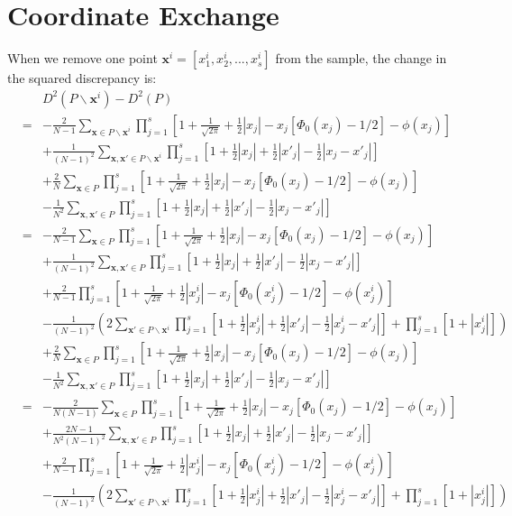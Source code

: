 \documentclass[12pt]{article}
\newcommand{\vx}{\boldsymbol{x}}
\begin{document}
\section{Coordinate Exchange}
When we remove one point $\vx^i = [x^i_{1},x^i_{2},...,x^i_{s}]$ from the sample, the change in the squared discrepancy is:
\begin{eqnarray*}
&&D^2(P\backslash \vx^i)-D^2(P)\\
&=& -\frac{2}{N-1}\sum\limits_{\vx\in P\backslash \vx^i} \prod\limits_{j=1}^s\left[ 1+\frac{1}{\sqrt{2\pi}}+\frac{1}{2}|x_j|-x_j[\Phi_0(x_j)-1/2]-\phi(x_j)\right]\\
  &&+\frac{1}{(N-1)^2}\sum_{\vx,\vx'\in P\backslash\vx^i}\prod_{j=1}^s \left[1+\frac{1}{2}|x_j|+\frac{1}{2}|x'_j|-\frac{1}{2}|x_j-x'_j|\right]\\
  &&+\frac{2}{N}\sum\limits_{\vx\in P} \prod\limits_{j=1}^s\left[ 1+\frac{1}{\sqrt{2\pi}}+\frac{1}{2}|x_j|-x_j[\Phi_0(x_j)-1/2]-\phi(x_j)\right]\\
  &&-\frac{1}{N^2}\sum_{\vx,\vx'\in P}\prod_{j=1}^s \left[1+\frac{1}{2}|x_j|+\frac{1}{2}|x'_j|-\frac{1}{2}|x_j-x'_j|\right]\\
  &=& -\frac{2}{N-1}\sum\limits_{\vx\in P} \prod\limits_{j=1}^s\left[ 1+\frac{1}{\sqrt{2\pi}}+\frac{1}{2}|x_j|-x_j[\Phi_0(x_j)-1/2]-\phi(x_j)\right]\\
  &&+\frac{1}{(N-1)^2}\sum_{\vx,\vx'\in P}\prod_{j=1}^s \left[1+\frac{1}{2}|x_j|+\frac{1}{2}|x'_j|-\frac{1}{2}|x_j-x'_j|\right]\\
  &&+\frac{2}{N-1}\prod\limits_{j=1}^s\left[ 1+\frac{1}{\sqrt{2\pi}}+\frac{1}{2}|x^i_{j}|-x_j[\Phi_0(x^i_{j})-1/2]-\phi(x^i_{j})\right]\\
  && - \frac{1}{(N-1)^2}\left(2\sum_{\vx'\in P\backslash \vx^i}\prod_{j=1}^s \left[1+\frac{1}{2}|x^i_{j}|+\frac{1}{2}|x'_j|-\frac{1}{2}|x^i_{j}-x'_j|\right]+\prod_{j=1}^s\left[1+|x^i_{j}|\right]\right)\\
  &&+\frac{2}{N}\sum\limits_{\vx\in P} \prod\limits_{j=1}^s\left[ 1+\frac{1}{\sqrt{2\pi}}+\frac{1}{2}|x_j|-x_j[\Phi_0(x_j)-1/2]-\phi(x_j)\right]\\
  &&-\frac{1}{N^2}\sum_{\vx,\vx'\in P}\prod_{j=1}^s \left[1+\frac{1}{2}|x_j|+\frac{1}{2}|x'_j|-\frac{1}{2}|x_j-x'_j|\right]\\
  &=&  -\frac{2}{N(N-1)}\sum\limits_{\vx\in P} \prod\limits_{j=1}^s\left[ 1+\frac{1}{\sqrt{2\pi}}+\frac{1}{2}|x_j|-x_j[\Phi_0(x_j)-1/2]-\phi(x_j)\right]\\
  && +\frac{2N-1}{N^2(N-1)^2} \sum_{\vx,\vx'\in P}\prod_{j=1}^s \left[1+\frac{1}{2}|x_j|+\frac{1}{2}|x'_j|-\frac{1}{2}|x_j-x'_j|\right]\\
&&+\frac{2}{N-1}\prod\limits_{j=1}^s\left[ 1+\frac{1}{\sqrt{2\pi}}+\frac{1}{2}|x^i_{j}|-x_j[\Phi_0(x^i_{j})-1/2]-\phi(x^i_{j})\right]\\
  && - \frac{1}{(N-1)^2}\left(2\sum_{\vx'\in P\backslash\vx^i}\prod_{j=1}^s \left[1+\frac{1}{2}|x^i_{j}|+\frac{1}{2}|x'_j|-\frac{1}{2}|x^i_{j}-x'_j|\right]+\prod_{j=1}^s\left[1+|x^i_{j}|\right]\right)\\
\end{eqnarray*}
\end{document}
